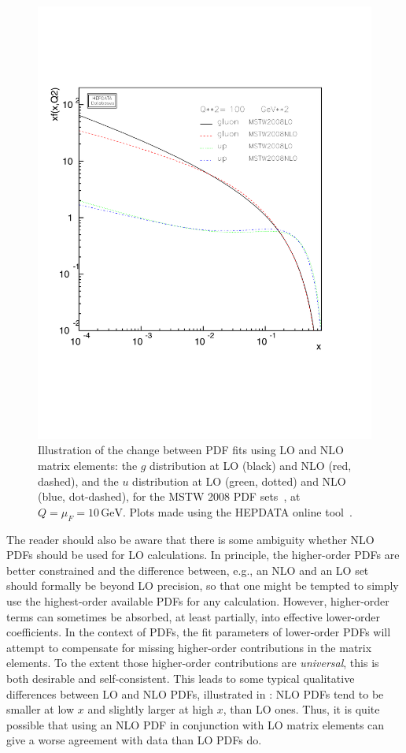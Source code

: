 \begin{figure}[t]
\centering
\includegraphics[scale=0.42]{pdforders}
\caption{Illustration of the change between PDF fits using LO and NLO
 matrix elements: the $g$ distribution at LO (black) and NLO (red,
 dashed), and the $u$ distribution at LO (green, dotted) and NLO (blue,
 dot-dashed), for the MSTW 2008 PDF sets~\cite{Martin:2009iq}, 
at $Q = \mu_F = 10\,\mathrm{GeV}$. 
Plots made using the HEPDATA online 
 tool~\cite{Buckley:2010jn}.\label{fig:pdforders}}
\end{figure}
The reader should also be aware that there is some ambiguity whether 
NLO PDFs should be used for 
 LO calculations. In principle, the higher-order PDFs are better
  constrained and the difference between, e.g., an NLO and an LO set
  should formally be beyond LO precision, so that one might be tempted
  to simply use the highest-order available PDFs for any calculation. 
  However, higher-order terms can sometimes be absorbed, at least partially,
  into effective lower-order  coefficients. In the
  context of PDFs, the fit parameters of lower-order PDFs will 
  attempt to compensate for missing higher-order
  contributions in the matrix 
  elements. To the extent those higher-order contributions are
  \emph{universal}, this is both desirable and
  self-consistent. This leads to some typical qualitative differences
  between LO and NLO PDFs, illustrated in : 
  NLO PDFs tend to be smaller at low $x$ and
      slightly larger at high $x$, than LO ones. Thus, it is quite
      possible that using an NLO PDF in conjunction with LO matrix
      elements can give a worse agreement with data than LO PDFs do. 

